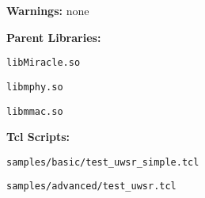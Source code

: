 \begin{description}
   \item {\bf Warnings:} none
   \item {\bf Parent Libraries:} 
        \begin{description}
         \item {\tt libMiracle.so}
	      \item {\tt libmphy.so} 
	      \item {\tt libmmac.so}
        \end{description}
   \item {\bf Tcl Scripts:} 
       \begin{description}
	      \item {\tt samples/basic/test\_uwsr\_simple.tcl}
	      \item {\tt samples/advanced/test\_uwsr.tcl}
      \end{description}
\end{description}

\vspace{1 cm}

